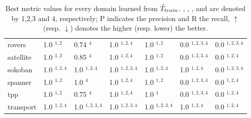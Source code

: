 \begin{table}[b!]
{\begin{tabular}{|l|l|l|l|l|l|l|}
rovers & 1.0 $^{1,2}$ & 0.74 $^{4}$ & 1.0 $^{1,2,4}$ & 1.0 $^{1,2}$ & 0.0 $^{1,2,3,4}$ & 0.0 $^{1,2,3,4}$ \\
satellite & 1.0 $^{1,2}$ & 0.85 $^{4}$ & 1.0 $^{1,2,4}$ & 1.0 $^{1,2}$ & 0.0 $^{1,2,3,4}$ & 0.0 $^{1,2,4}$ \\
sokoban & 1.0 $^{1,2,4}$ & 1.0 $^{1,2,4}$ & 1.0 $^{1,2,3,4}$ & 1.0 $^{1,2,4}$ & 1.0 $^{1,2,4}$ & 0.0 $^{1,2,3,4}$ \\
spanner & 1.0 $^{1,2}$ & 1.0 $^{4}$ & 1.0 $^{1,2,4}$ & 1.0 $^{1,2}$ & 0.0 $^{1,2,3,4}$ & 0.0 $^{1,2,4}$ \\
tpp & 1.0 $^{1,2}$ & 0.75 $^{4}$ & 1.0 $^{1,2,4}$ & 1.0 $^{1}$ & 0.0 $^{1,2,3,4}$ & 0.0 $^{1,2,4}$ \\
transport & 1.0 $^{1,2,4}$ & 1.0 $^{1,2,3,4}$ & 1.0 $^{1,2,3,4}$ & 1.0 $^{1,2,3,4}$ & 1.0 $^{1,2,4}$ & 0.0 $^{1,2,4}$ \\
\hline
\end{tabular}
}
\caption{Best metric values for every domain learned from $\hat{T}_{train}$. \sam, \offlam, \rosame, and \nolam are denoted by 1,2,3 and 4, respectively; P indicates the precision and R the recall, $\uparrow$ (resp. $\downarrow$) denotes the higher (resp. lower) the better.
}
\label{tab:best-2traces}
\end{table}




